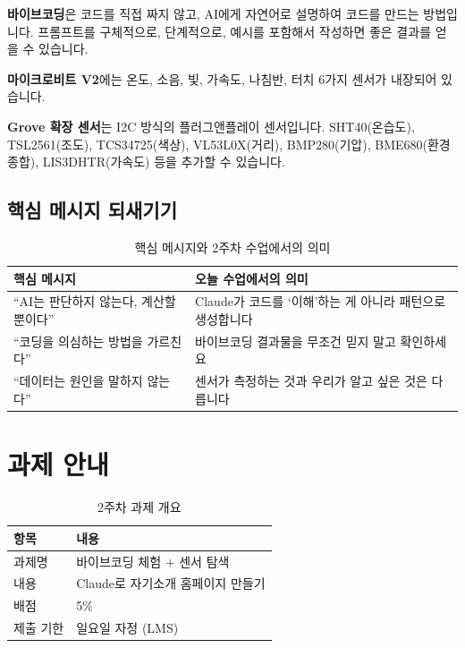 \documentclass[11pt, a4paper]{article}
\begin{document}
\textbf{바이브코딩}은 코드를 직접 짜지 않고, AI에게 자연어로 설명하여 코드를 만드는 방법입니다. 프롬프트를 구체적으로, 단계적으로, 예시를 포함해서 작성하면 좋은 결과를 얻을 수 있습니다.

\textbf{마이크로비트 V2}에는 온도, 소음, 빛, 가속도, 나침반, 터치 6가지 센서가 내장되어 있습니다.

\textbf{Grove 확장 센서}는 I2C 방식의 플러그앤플레이 센서입니다. SHT40(온습도), TSL2561(조도), TCS34725(색상), VL53L0X(거리), BMP280(기압), BME680(환경 종합), LIS3DHTR(가속도) 등을 추가할 수 있습니다.

\subsection{핵심 메시지 되새기기}

\begin{table}[H]\centering
\caption{핵심 메시지와 2주차 수업에서의 의미}
\begin{tabular}{p{5cm}p{7.5cm}}\toprule
\textbf{핵심 메시지} & \textbf{오늘 수업에서의 의미} \\\midrule
``AI는 판단하지 않는다, 계산할 뿐이다'' & Claude가 코드를 `이해'하는 게 아니라 패턴으로 생성합니다 \\
``코딩을 의심하는 방법을 가르친다'' & 바이브코딩 결과물을 무조건 믿지 말고 확인하세요 \\
``데이터는 원인을 말하지 않는다'' & 센서가 측정하는 것과 우리가 알고 싶은 것은 다릅니다 \\
\bottomrule
\end{tabular}
\end{table}

\section{과제 안내}

\begin{table}[H]\centering
\caption{2주차 과제 개요}
\begin{tabular}{ll}\toprule
\textbf{항목} & \textbf{내용} \\\midrule
과제명 & 바이브코딩 체험 + 센서 탐색 \\
내용 & Claude로 자기소개 홈페이지 만들기 \\
배점 & 5\% \\
제출 기한 & 일요일 자정 (LMS) \\
\bottomrule
\end{tabular}
\end{table}
\end{document}
